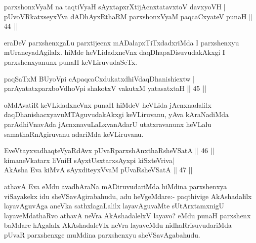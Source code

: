 
\begin{shl}
parxshonxV\s yaM na taqtiVyaH sAyxtapxrXtijAcnxtatavxtoV davxyoVH |\\
pUvoVRkatxseyxYva dADhAyxRthaRM parxshonxV\s yaM paqcaCxyateV punaH \hfill || 44 ||
\end{shl}

\begin{artha}
eraDeV parxshenxgaLu parxtijecnx mADalapxTiTxdadxriMda I parxshenxyu mUraneyadAgilalx. hiMde heVLidadxneVnx daqDhapaDisuvudakAkxgi I parxshenxyanunx punaH keVLiruvudaSeTx.
\end{artha}

\begin{shl}
paqSaTxM BUyoV\s pi cApaqcaCxdukatxdhiVdaqDhanishicxtw |\\
\footnotemark[1]parAyatatxparxboVdhoV\s pi shakotxV vakutxM yatasatxtaH \hfill || 45 ||
\end{shl}

\begin{artha}
oMdAvatiR keVLidadxneVnx punaH hiMdeV heVLida jAcnxnadalilx daqDhanishacxyavuMTAguvudakAkxgi keVLiruvanu, yAva kAraNadiMda parAdhiVnavAda jAcnxnavuLaLxvanAdarU utatxravanunx heVLalu samathaRnAgiruvanu adariMda keVLiruvanu.
\end{artha}

\begin{shl}
EveVtayxvadhaqteVyaRdAvx pUvaRparxshAnxthaRsheVSatA \hfill || 46 ||\\
kimaneVkatarx liVniH sAyxtUsxtarxsAyxpi kiSxteVriva|\\
AkAsha Eva kiMvA sAyxditeyxVvaM pUvaRsheVSatA \hfill || 47 ||
\end{shl}

\begin{artha}%
athavA Eva eMdu avadhAraNa mADiruvudariMda hiMdina parxshenxya viSayakekx idu sheVSavAgirabahudu, adu heVgeMdare:- paqthivige AkAshadalilx layavAguvAga aneVka sathxlagaLalilx layavAguvaMte sUtArxtamxnigU layaveMdathaRvo athavA neVra AkAshadalelxV layavo? eMdu punaH parxshenx baMdare hAgalalx AkAshadaleVlx neVra layaveMdu nidhaRrisuvudariMda pUvaR parxshenxge muMdina parxshenxyu sheVSavAgabahudu.
\end{artha}

